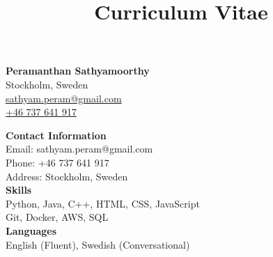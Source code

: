 \documentclass[13pt,a4paper,sans,colorlinks,urlcolor=violet,hyperindex,plainpages=false,bookmarksopen,bookmarksnumbered,pdfusetitle]{moderncv}
\title{Curriculum Vitae}
\begin{document}
\vspace{-2em}
{\huge\textbf{Peramanthan Sathyamoorthy}} \\[0.5em]
Stockholm, Sweden \\
\href{mailto:sathyam.peram@gmail.com}{sathyam.peram@gmail.com} \\
\href{tel:+46737641917}{+46 737 641 917}
\vspace{1em} %

\noindent
\begin{minipage}[t]{0.3\textwidth} %
  \colorbox{sidebarcolor}{%
    \parbox[t][\textheight][t]{\linewidth}{ %
      \vspace{1em} %
      \textbf{Contact Information} \\[0.5em]
      Email: sathyam.peram@gmail.com \\[0.5em]
      Phone: +46 737 641 917 \\[0.5em]
      Address: Stockholm, Sweden \\[1em]

      \textbf{Skills} \\[0.5em]
      Python, Java, C++, HTML, CSS, JavaScript \\[0.5em]
      Git, Docker, AWS, SQL \\[1em]

      \textbf{Languages} \\[0.5em]
      English (Fluent), Swedish (Conversational)
    }
  }
\end{minipage}%
\hspace{0.05\textwidth} %
\end{document}
